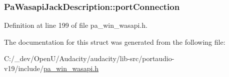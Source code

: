 \subsubsection[{\texorpdfstring{port\+Connection}{portConnection}}]{ Pa\+Wasapi\+Jack\+Description\+::port\+Connection}\hypertarget{struct_pa_wasapi_jack_description_a5c78feaba82b02de3997a698231b5f05}{}\label{struct_pa_wasapi_jack_description_a5c78feaba82b02de3997a698231b5f05}


Definition at line 199 of file pa\+\_\+win\+\_\+wasapi.\+h.



The documentation for this struct was generated from the following file\+:\begin{DoxyCompactItemize}
\item 
C\+:/\+\_\+dev/\+Open\+U/\+Audacity/audacity/lib-\/src/portaudio-\/v19/include/\hyperlink{pa__win__wasapi_8h}{pa\+\_\+win\+\_\+wasapi.\+h}\end{DoxyCompactItemize}
